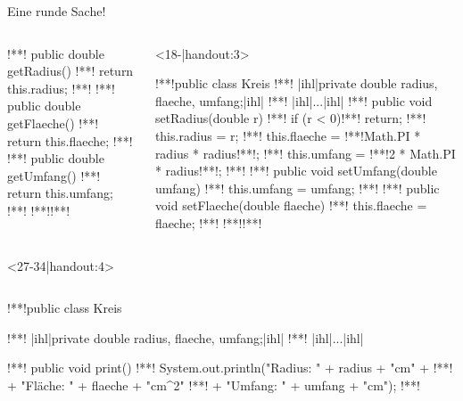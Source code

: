 \begin{frame}[c,fragile]{Eine runde Sache!}
\begin{onlyenv}
\begin{columns}[c,onlytextwidth]
\begin{onlyenv}
\begin{plainjava}
{!**!   public double getRadius() {
!**!       return this.radius;
!**!   }
!**!   public double getFlaeche() {
!**!       return this.flaeche;
!**!   }
!**!   public double getUmfang() {
!**!       return this.umfang;
!**!   }
!**!}!**!
\end{plainjava}
\end{onlyenv}
\begin{onlyenv}<18-|handout:3>
\begin{plainjava}
!**!public class Kreis {
!**!   |ihl|private double radius, flaeche, umfang;|ihl|
!**!   |ihl|...|ihl|
!**!   public void setRadius(double r) {
!**!       if (r < 0)!**! return;
!**!       this.radius = r;
!**!       this.flaeche = !**!Math.PI * radius * radius!**!;
!**!       this.umfang = !**!2 * Math.PI * radius!**!;
!**!   }
!**!   public void setUmfang(double umfang) {
!**!       this.umfang = umfang;
!**!   }
!**!   public void setFlaeche(double flaeche) {
!**!       this.flaeche = flaeche;
!**!   }
!**!}!**!
\end{plainjava}
\end{onlyenv}
\end{columns}
\end{onlyenv}
\begin{onlyenv}<27-34|handout:4>
\begin{columns}[c,onlytextwidth]
\footnotesize{}\medskip\par
{}
\SetupLstHl
\begin{plainjava}
!**!public class Kreis {
!**!   |ihl|private double radius, flaeche, umfang;|ihl|
!**!   |ihl|...|ihl|

!**!   public void print() {
!**!      System.out.println("Radius: " + radius + "cm" +
!**!           + "\n Fläche: " + flaeche + "cm^2"
!**!           + "\n Umfang: " + umfang + "cm");
!**!   }

}
\end{plainjava}
\end{columns}
\end{onlyenv}
\end{frame}
